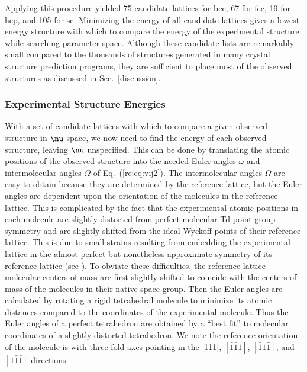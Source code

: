 \documentclass[preprint]{iucr}              %
\newcommand{\mb}[1]{\ensuremath{\mbox{\boldmath $ #1 $}}}
\begin{document}
Applying this procedure yielded 75 candidate lattices for bcc, 67 for fcc, 19
for hcp, and 105 for sc. Minimizing the energy of all
candidate lattices gives a lowest energy structure with which to
compare the energy of the experimental structure while searching
parameter space.  Although these candidate lists are remarkably small compared
to the thousands of structures generated in many crystal structure prediction
programs, they are sufficient to place most of the observed structures as
discussed in Sec.~\ref{discussion}.


\subsubsection{Experimental Structure Energies}

With a set of candidate lattices with which to compare a given observed
structure in $\mb{\nu}$-space, we now need to find the energy of each
observed structure, leaving $\mb{\nu}$ unspecified.  This can be done by
translating the atomic positions of the observed structure into the needed Euler
angles $\omega$ and intermolecular angles $\Omega$ of Eq.\
(\ref{re:eq:vij2}). The intermolecular angles $\Omega$
are easy to obtain because they are determined by the reference lattice, but the
Euler angles are dependent upon the orientation of the molecules in the
reference lattice. This is complicated by the fact that the experimental atomic
positions in each molecule are slightly distorted from perfect molecular Td
point group symmetry and are slightly shifted from the ideal Wyckoff points
of their reference lattice.  This is due to small strains resulting from
embedding the experimental lattice in the almost perfect but nonetheless
approximate symmetry of its reference lattice (see
\cite{McClurg09}). To obviate these difficulties, the reference lattice
molecular centers of mass are first slightly shifted to coincide with the
centers of mass of the molecules in their native space group.  Then the Euler angles are
calculated by rotating a rigid tetrahedral molecule to minimize its atomic
distances compared to the coordinates of the experimental molecule.  Thus the
Euler angles of a perfect tetrahedron are obtained by a ``best fit'' to
molecular coordinates of a slightly distorted tetrahedron. We note the reference
orientation of the molecule is with three-fold axes pointing in the [111],
$[\bar{1}\bar{1}1]$, $[\bar{1}1\bar{1}]$, and $[1\bar{1}\bar{1}]$ directions.
\end{document}
